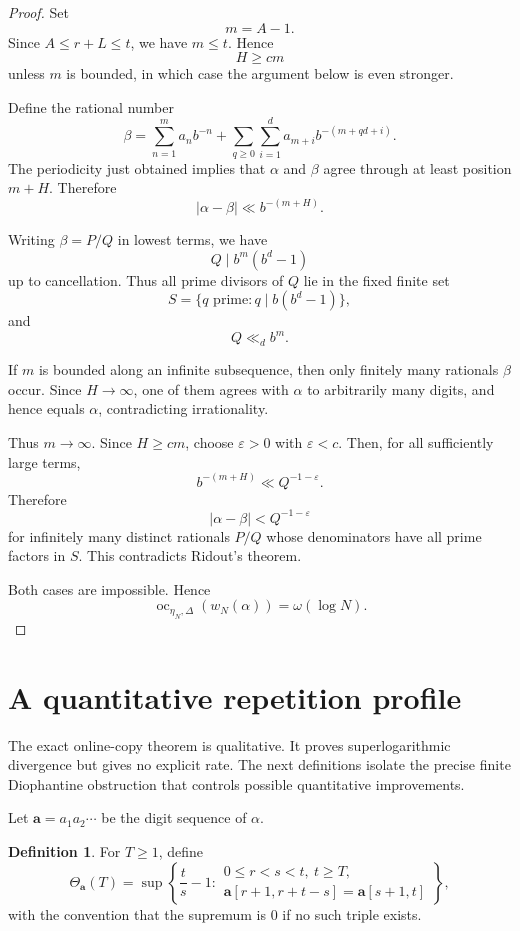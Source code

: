 \documentclass[11pt]{amsart}
\theoremstyle{definition}
\newtheorem{definition}[theorem]{Definition}
\DeclareMathOperator{\oc}{oc}
\begin{document}
\begin{proof}
Set
\[
m=A-1.
\]
Since \(A\leq r+L\leq t\), we have \(m\leq t\). Hence
\[
H\geq cm
\]
unless \(m\) is bounded, in which case the argument below is even stronger.

Define the rational number
\[
\beta
=
\sum_{n=1}^{m}a_n b^{-n}
+
\sum_{q\geq 0}\sum_{i=1}^{d}
a_{m+i}b^{-(m+qd+i)}.
\]
The periodicity just obtained implies that \(\alpha\) and \(\beta\) agree through at least position \(m+H\). Therefore
\[
|\alpha-\beta|\ll b^{-(m+H)}.
\]

Writing \(\beta=P/Q\) in lowest terms, we have
\[
Q\mid b^m(b^d-1)
\]
up to cancellation. Thus all prime divisors of \(Q\) lie in the fixed finite set
\[
S=\{q\text{ prime}:q\mid b(b^d-1)\},
\]
and
\[
Q\ll_d b^m.
\]

If \(m\) is bounded along an infinite subsequence, then only finitely many rationals \(\beta\) occur. Since \(H\to\infty\), one of them agrees with \(\alpha\) to arbitrarily many digits, and hence equals \(\alpha\), contradicting irrationality.

Thus \(m\to\infty\). Since \(H\geq cm\), choose \(\varepsilon>0\) with \(\varepsilon<c\). Then, for all sufficiently large terms,
\[
b^{-(m+H)}\ll Q^{-1-\varepsilon}.
\]
Therefore
\[
|\alpha-\beta|<Q^{-1-\varepsilon}
\]
for infinitely many distinct rationals \(P/Q\) whose denominators have all prime factors in \(S\). This contradicts Ridout's theorem.

Both cases are impossible. Hence
\[
\oc_{\eta_N,\Delta}(w_N(\alpha))
=
\omega(\log N).
\]
\end{proof}

\section{A quantitative repetition profile}

The exact online-copy theorem is qualitative. It proves superlogarithmic divergence but gives no explicit rate. The next definitions isolate the precise finite Diophantine obstruction that controls possible quantitative improvements.

Let \(\mathbf a=a_1a_2\cdots\) be the digit sequence of \(\alpha\).

\begin{definition}
For \(T\geq 1\), define
\[
\Theta_{\mathbf a}(T)
=
\sup
\left\{
\frac{t}{s}-1:
\begin{array}{l}
0\leq r<s<t,\ t\geq T,\\
\mathbf a[r+1,r+t-s]=\mathbf a[s+1,t]
\end{array}
\right\},
\]
with the convention that the supremum is \(0\) if no such triple exists.
\end{definition}
\end{document}
